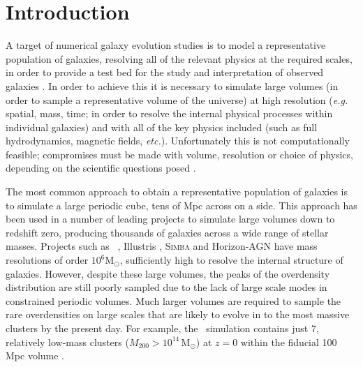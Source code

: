 
\section{Introduction}

A target of numerical galaxy evolution studies is to model a representative population of galaxies, resolving all of the relevant physics at the required scales, in order to provide a test bed for the study and interpretation of observed galaxies \citep{benson_galaxy_2010}.
In order to achieve this it is necessary to simulate large volumes (in order to sample a representative volume of the universe) at high resolution (\textit{e.g.} spatial, mass, time; in order to resolve the internal physical processes within individual galaxies) and with all of the key physics included (such as full hydrodynamics, magnetic fields, \textit{etc.}).
Unfortunately this is not computationally feasible; compromises must be made with volume, resolution or choice of physics, depending on the scientific questions posed \citep[for a review, see][]{somerville_physical_2015}.

The most common approach to obtain a representative population of galaxies is to simulate a large periodic cube, tens of Mpc across on a side.
This approach has been used in a number of leading projects to simulate large volumes down to redshift zero, producing thousands of galaxies across a wide range of stellar masses.
Projects such as \eagle\ \citep{schaye_eagle_2015}, Illustris \citep{vogelsberger_introducing_2014}, \textsc{Simba} \citep{dave_simba:_2019} and Horizon-AGN \citep{dubois_dancing_2014} have mass resolutions of order $10^6 \mathrm{M_{\odot}}$, sufficiently high to resolve the internal structure of galaxies.
However, despite these large volumes, the peaks of the overdensity distribution are still poorly sampled due to the lack of large scale modes in constrained periodic volumes.
Much larger volumes are required to sample the rare overdensities on large scales that are likely to evolve in to the most massive clusters by the present day.
For example, the \eagle\ simulation contains just 7, relatively low-mass clusters ($M_{200} > 10^{14} \, \mathrm{M_{\odot}}$) at $z=0$ within the fiducial 100 Mpc volume \citep{schaye_eagle_2015}.


